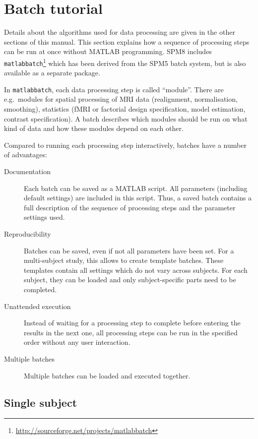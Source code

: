 \chapter{Batch tutorial}
\label{Chap:batch:tutorial}

Details about the algorithms used for data processing are given in the other
sections of this manual. This section explains how a sequence of processing
steps can be run at once without MATLAB programming. SPM8 includes
\texttt{matlabbatch}\footnote{\url{http://sourceforge.net/projects/matlabbatch}}
which has been derived from the SPM5 batch system, but is also available as a
separate package.

In \texttt{matlabbatch}, each data processing step is called ``module''. There
are e.g.\ modules for spatial processing of MRI data (realignment,
normalisation, smoothing), statistics (fMRI or factorial design specification,
model estimation, contrast specification). A batch describes which modules
should be run on what kind of data and how these modules depend on each other.

Compared to running each processing step interactively, batches have a number
of advantages:
\begin{description}
\item[Documentation] Each batch can be saved as a MATLAB script. All
  parameters (including default settings) are included in this script. Thus, a
  saved batch contains a full description of the sequence of processing steps
  and the parameter settings used.
\item[Reproducibility] Batches can be saved, even if not all parameters have
  been set. For a multi-subject study, this allows to create template batches.
  These templates contain all settings which do not vary across subjects. For
  each subject, they can be loaded and only subject-specific parts need to be
  completed.
\item[Unattended execution] Instead of waiting for a processing step to
  complete before entering the results in the next one, all processing steps
  can be run in the specified order without any user interaction.
\item[Multiple batches] Multiple batches can be loaded and executed together.
\end{description}

\section{Single subject}

